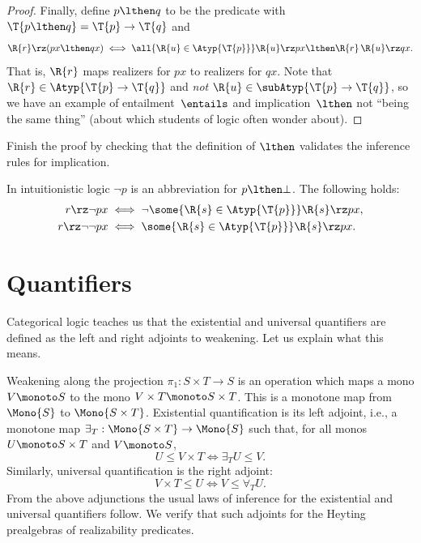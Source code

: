 \begin{proof}
  Finally, define $p \lthen q$ to be the predicate with $\T{p \lthen q} = \T{p} \to \T{q}$ and
  \begin{equation*}
    \R{r} \rz (p x \lthen q x)
    \iff
      \all{\R{u} \in \Atyp{\T{p}}}
        \R{u} \rz p x
        \lthen
        \R{r}\,\R{u} \rz q x.
  \end{equation*}
  That is, $\R{r}$ maps realizers for $p x$ to realizers for $q x$.
  Note that $\R{r} \in \Atyp{\T{p} \to \T{q}}$ and \emph{not} $\R{u} \in \subAtyp{\T{p} \to \T{q}}$, so we have an example of entailment~$\entails$ and implication~$\lthen$ not ``being the same thing'' (about which students of logic often wonder about).
\end{proof}

\begin{exercise}
  Finish the proof by checking that the definition of $\lthen$ validates the inference rules for implication.
\end{exercise}

In intuitionistic logic  $\neg p$ is an abbreviation for $p \lthen \bot$. The following holds:
%
\begin{align*}
  r \rz \neg p x
  &\iff
  \lnot \some{\R{s} \in \Atyp{\T{p}}} \R{s} \rz p x, \\
  r \rz \neg \neg p x
  &\iff
  \some{\R{s} \in \Atyp{\T{p}}} \R{s} \rz p x.
\end{align*}


\section{Quantifiers}
\label{sec:quantifiers}

Categorical logic teaches us that the existential and universal quantifiers are defined as the left and right adjoints to weakening. Let us explain what this means.

Weakening along the projection $\pi_1 : S \times T \to S$ is an operation which maps a
mono $V \monoto S$ to the mono $V \times T \monoto S \times T$. This is a monotone map
from $\Mono{S}$ to $\Mono{S \times T}$. Existential quantification is its left adjoint,
i.e., a monotone map $\exists_{T} : \Mono{S \times T} \to \Mono{S}$ such that, for all
monos $U \monoto S \times T$ and $V \monoto S$,
%
\begin{equation*}
  U \leq V \times T
  \iff
  \exists_{T} U \leq V.
\end{equation*}
%
Similarly, universal quantification is the right adjoint:
%
\begin{equation*}
  V \times T \leq U
  \iff
  V \leq \forall_{T} U.
\end{equation*}
%
From the above adjunctions the usual laws of inference for the existential and universal quantifiers follow. We verify that such adjoints for the Heyting prealgebras of realizability predicates.

